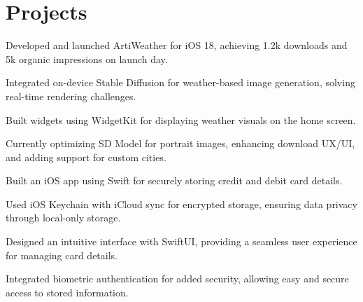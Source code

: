 \documentclass[]{deedy-resume-openfont}
\begin{document}
\begin{minipage}[t]{0.98\textwidth}
\section{Projects}


\textbf{\href{https://apps.apple.com/app/artiweather/id6446815662}{}} 
\begin{tightemize}
    \item Developed and launched ArtiWeather for iOS 18, achieving 1.2k downloads and 5k organic impressions on launch day.
    \item Integrated on-device Stable Diffusion for weather-based image generation, solving real-time rendering challenges.
    \item Built widgets using WidgetKit for displaying weather visuals on the home screen.
    \item Currently optimizing SD Model for portrait images, enhancing download UX/UI, and adding support for custom cities.
\end{tightemize}
\sectionsep

\textbf{\href{https://github.com/swiftlysingh/Holder}{}} 
\begin{tightemize}
    \item Built an iOS app using Swift for securely storing credit and debit card details.
    \item Used iOS Keychain with iCloud sync for encrypted storage, ensuring data privacy through local-only storage.
    \item Designed an intuitive interface with SwiftUI, providing a seamless user experience for managing card details.
    \item Integrated biometric authentication for added security, allowing easy and secure access to stored information.
\end{tightemize}


\end{minipage}
\end{document}
